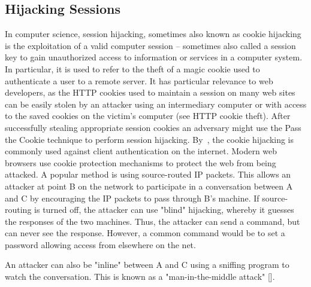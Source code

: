 \subsection{Hijacking Sessions}\label{subsec:hijacking-sessions}
In computer science, session hijacking, sometimes also known as cookie hijacking is the exploitation of a valid computer
session -- sometimes also called a session key to gain unauthorized access to information or services in a computer system.
In particular, it is used to refer to the theft of a magic cookie used to authenticate a user to a remote server.
It has particular relevance to web developers, as the HTTP cookies used to maintain a session on many web sites
can be easily stolen by an attacker using an intermediary computer or with access to the saved cookies on the victim's
computer (see HTTP cookie theft).
After successfully stealing appropriate session cookies an adversary might use the Pass the Cookie technique to perform
session hijacking.
By~\cite{bugliesi2015cookiext}, the cookie hijacking is commonly used against client authentication on the internet.
Modern web browsers use cookie protection mechanisms to protect the web from being attacked.
A popular method is using source-routed IP packets.
This allows an attacker at point B on the network to participate in a conversation between A and C by encouraging the
IP packets to pass through B's machine.
If source-routing is turned off, the attacker can use "blind" hijacking, whereby it guesses the responses of the two
machines.
Thus, the attacker can send a command, but can never see the response.
However, a common command would be to set a password allowing access from elsewhere on the net.

An attacker can also be "inline" between A and C using a sniffing program to watch the conversation.
This is known as a "man-in-the-middle attack" [\cite{callegati2009man}].
